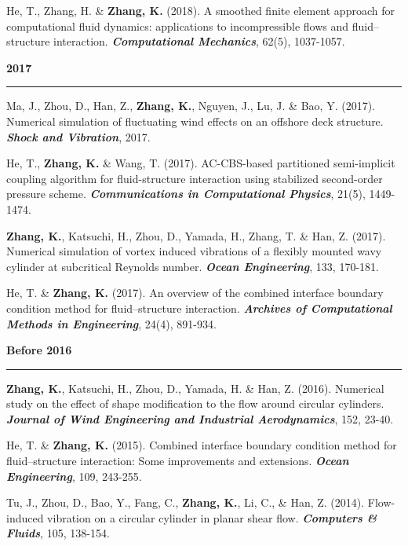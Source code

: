 \documentclass[10pt]{article}
\begin{document}
{\begin{etaremune}
  \item He, T., Zhang, H. \& \textbf{Zhang, K.} (2018). A smoothed finite element approach for computational fluid dynamics: applications to incompressible flows and fluid–structure interaction. \textit{\textbf{Computational Mechanics}}, 62(5), 1037-1057.
 \item [] {\bf \color{Blue} 2017 \rule{14.8cm}{0.2mm}}   
  \item Ma, J., Zhou, D., Han, Z., \textbf{Zhang, K.}, Nguyen, J., Lu, J. \& Bao, Y. (2017). Numerical simulation of fluctuating wind effects on an offshore deck structure. \textit{\textbf{Shock and Vibration}}, 2017.
  
  \item He, T., \textbf{Zhang, K.} \& Wang, T. (2017). AC-CBS-based partitioned semi-implicit coupling algorithm for fluid-structure interaction using stabilized second-order pressure scheme. \textit{\textbf{Communications in Computational Physics}}, 21(5), 1449-1474.
  
  \item \textbf{Zhang, K.}, Katsuchi, H., Zhou, D., Yamada, H., Zhang, T. \& Han, Z. (2017). Numerical simulation of vortex induced vibrations of a flexibly mounted wavy cylinder at subcritical Reynolds number. \textit{\textbf{Ocean Engineering}}, 133, 170-181.
  
  \item He, T. \& \textbf{Zhang, K.} (2017). An overview of the combined interface boundary condition method for fluid–structure interaction. \textit{\textbf{Archives of Computational Methods in Engineering}}, 24(4), 891-934.
  
   \item [] {\color{Blue} {\bf  Before  2016}\rule{13.6cm}{0.2mm} }
  
  \item \textbf{Zhang, K.}, Katsuchi, H., Zhou, D., Yamada, H. \& Han, Z. (2016). Numerical study on the effect of shape modification to the flow around circular cylinders. \textit{\textbf{Journal of Wind Engineering and Industrial Aerodynamics}}, 152, 23-40.
  
  \item He, T. \& \textbf{Zhang, K.} (2015). Combined interface boundary condition method for fluid–structure interaction: Some improvements and extensions. \textit{\textbf{Ocean Engineering}}, 109, 243-255.
  
  \item Tu, J., Zhou, D., Bao, Y., Fang, C., \textbf{Zhang, K.}, Li, C., \& Han, Z. (2014). Flow-induced vibration on a circular cylinder in planar shear flow. \textit{\textbf{Computers \& Fluids}}, 105, 138-154.
  
\end{etaremune}
}
\end{document}
